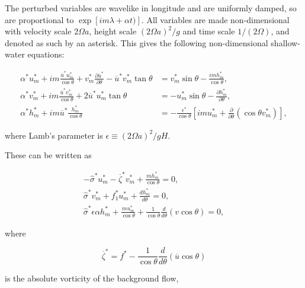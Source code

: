\documentclass[12pt]{article}
\begin{document}
The perturbed variables are wavelike in longitude and are uniformly damped, so are proportional to $\exp [i m \lambda+\alpha t)]$. All variables are made non-dimensional with velocity scale $2 \Omega a$, height scale $(2 \Omega a)^{2}/g$ and time scale $1/(2\Omega)$, and denoted as such by an asterisk. This gives the following non-dimensional shallow-water equations:

\begin{equation}
  \begin{aligned}
    \alpha^{*} u_{m}^{*}+i m \frac{\overline{u}^{*} u_{m}^{*}}{\cos \theta}+v_{m}^{*} \frac{\partial \overline{u}^{*}}{\partial \theta}-\overline{u}^{*} v_{m}^{*} \tan \theta &=v_{m}^{*} \sin \theta-\frac{i m h_{m}^{*}}{\cos \theta}, \\
    \alpha^{*} v_{m}^{*}+i m \frac{\overline{u}^{*} v_{m}^{*}}{\cos \theta}+2 \overline{u}^{*} u_{m}^{*} \tan \theta &=-u_{m}^{*} \sin \theta-\frac{\partial h_{m}^{*}}{\partial \theta}, \\
    \alpha^{*} h_{m}^{*}+i m \overline{u}^{*} \frac{h_{m}^{*}}{\cos \theta} &=-\frac{\epsilon^{*}}{\cos \theta}\left[i m u_{m}^{*}+\frac{\partial}{\partial \theta}\left(\cos \theta v_{m}^{*}\right)\right],
  \end{aligned}
\end{equation}

where Lamb's parameter is $\epsilon \equiv(2 \Omega a)^{2} / g H$.

These can be written as

\begin{equation}
  \begin{aligned}
    - \hat{\sigma}^{*} u_{m}^{*} - \overline{\zeta}^{*}v_{m}^{*} + \frac{m h_{m}^{*} }{\cos \theta} = 0, \\
    \hat{\sigma}^{*}  v_{m}^{*} + f_{1}^{*}u_{m}^{*} + \frac{d h_{m}^{*}}{d \theta} = 0, \\
    \hat{\sigma}^{*}  \epsilon \alpha h_{m}^{*}+ \frac{m u_{m}^{*}}{\cos \theta} + \frac{1}{\cos \theta} \frac{d}{d \theta}(v \cos \theta) = 0,
  \end{aligned}
\end{equation}

where

\begin{equation}
    \overline{\zeta}^{*} = f^{*} - \frac{1}{\cos \theta} \frac{d}{d \theta}(\overline{u} \cos \theta)
\end{equation}

is the absolute vorticity of the background flow,
\end{document}
